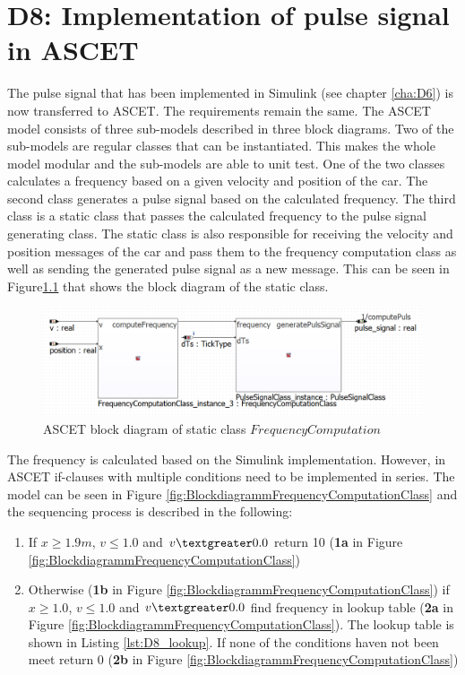 \chapter{D8: Implementation of pulse signal in ASCET}\label{cha:D8}

The pulse signal that has been implemented in Simulink (see chapter \ref{cha:D6}) is now transferred to ASCET. The requirements remain the same.
The ASCET model consists of three sub-models described in three block diagrams. Two of the sub-models are regular classes that can be instantiated. This makes the whole model modular and the sub-models are able to unit test. One of the two classes calculates a frequency based on a given velocity and position of the car. The second class generates a pulse signal based on the calculated frequency.
The third class is a static class that passes the calculated frequency to the pulse signal generating class. The static class is also responsible for receiving the velocity and position messages of the car and pass them to the frequency computation class as well as sending the generated pulse signal as a new message. This can be seen in Figure\ref{fig:BlockdiagrammFrequencyComputation} that shows the block diagram of the static class.

\begin{figure}[H]
\centering
\includegraphics[width=1\textwidth]{images/Blockdiagramm_FrequencyComputation.png}
\caption{ASCET block diagram of static class $FrequencyComputation$}
\label{fig:BlockdiagrammFrequencyComputation}
\end{figure}

The frequency is calculated based on the Simulink implementation. However, in ASCET if-clauses with multiple conditions need to be implemented in series. The model can be seen in Figure \ref{fig:BlockdiagrammFrequencyComputationClass} and the sequencing process is described in the following:

\begin{enumerate}
\item If $x \geq 1.9m$, $v \leq 1.0$ and $v \textgreater 0.0$ return 10 (\textbf{1a} in Figure \ref{fig:BlockdiagrammFrequencyComputationClass})
\item Otherwise (\textbf{1b} in Figure \ref{fig:BlockdiagrammFrequencyComputationClass}) if $x \geq 1.0$, $v \leq 1.0$ and $v \textgreater 0.0$ find frequency in lookup table (\textbf{2a} in Figure \ref{fig:BlockdiagrammFrequencyComputationClass}). The lookup table is shown in Listing \ref{lst:D8_lookup}. If none of the conditions haven not been meet return 0 (\textbf{2b} in Figure \ref{fig:BlockdiagrammFrequencyComputationClass})
\end{enumerate}

